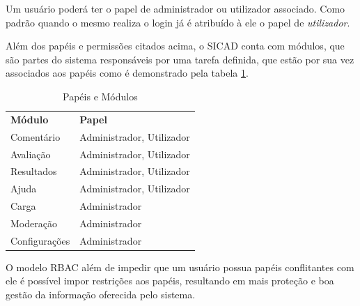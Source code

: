 \documentclass[12pt, a4paper]{report}
\begin{document}
Um usuário poderá ter o papel de administrador ou utilizador associado. Como padrão quando o mesmo realiza o login já é atribuído à ele o papel de \textit{utilizador}.

Além dos papéis e permissões citados acima, o \ac{SICAD} conta com módulos, que são partes do sistema responsáveis por uma tarefa definida, que estão por sua vez associados aos papéis como é demonstrado pela tabela  \ref{tab:papelmod}.

\begin{table}
 \centering
 {\renewcommand\arraystretch{1.25}
 
 \begin{tabular}{ l l }
  \cline{1-1}\cline{2-2}  
    \multicolumn{1}{|p{3.850cm}|}{\textbf{Módulo} \centering } &
    \multicolumn{1}{p{7.217cm}|}{\textbf{Papel} \centering }
  \\  
  \cline{1-1}\cline{2-2}  
    \multicolumn{1}{|p{3.850cm}|}{Comentário} &
    \multicolumn{1}{p{6.217cm}|}{Administrador, Utilizador}
  \\  
  \cline{1-1}\cline{2-2}  
    \multicolumn{1}{|p{3.850cm}|}{Avaliação} &
    \multicolumn{1}{p{6.217cm}|}{Administrador, Utilizador}
  \\  
    \cline{1-1}\cline{2-2}  
    \multicolumn{1}{|p{3.850cm}|}{Resultados} &
    \multicolumn{1}{p{6.217cm}|}{Administrador, Utilizador}
  \\  
    \cline{1-1}\cline{2-2}  
    \multicolumn{1}{|p{3.850cm}|}{Ajuda} &
    \multicolumn{1}{p{6.217cm}|}{Administrador, Utilizador}
  \\  
    \cline{1-1}\cline{2-2}  
    \multicolumn{1}{|p{3.850cm}|}{Carga} &
    \multicolumn{1}{p{6.217cm}|}{Administrador}
  \\  
    \cline{1-1}\cline{2-2}  
    \multicolumn{1}{|p{3.850cm}|}{Moderação} &
    \multicolumn{1}{p{6.217cm}|}{Administrador}
  \\  
    \cline{1-1}\cline{2-2}  
    \multicolumn{1}{|p{3.850cm}|}{Configurações} &
    \multicolumn{1}{p{6.217cm}|}{Administrador}
  \\  
  \hline
 \end{tabular} }
 \caption{Papéis e Módulos}
 \label{tab:papelmod}
\end{table}

O modelo RBAC além de impedir que um usuário possua papéis conflitantes com ele é possível impor restrições aos papéis, resultando em mais proteção e boa gestão da informação oferecida pelo sistema.
\end{document}

